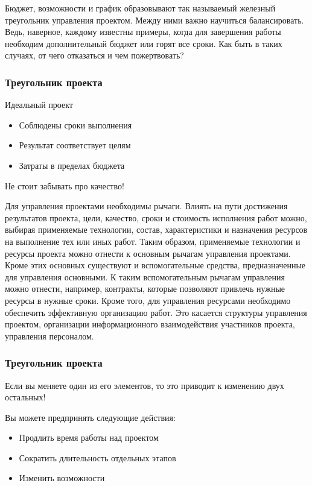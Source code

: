 \documentclass{../industrial-development}
\begin{document}
Бюджет, возможности и график образовывают так называемый железный треугольник управления проектом. Между ними важно научиться балансировать. Ведь, наверное, каждому известны примеры, когда для завершения работы необходим дополнительный бюджет или горят все сроки. Как быть в таких случаях, от чего отказаться и чем пожертвовать?
    
    \begin{frame} \frametitle{Треугольник проекта}
        \begin{block}{Идеальный проект}
            \begin{itemize}
                \item Соблюдены сроки выполнения
                \item Результат соответствует целям
                \item Затраты в пределах бюджета
            \end{itemize}
        \end{block}
        \medskip
        Не стоит забывать про \alert{качество}!
    \end{frame}
    \lecturenotes

Для управления проектами необходимы рычаги. Влиять на пути достижения результатов проекта, цели, качество, сроки и стоимость исполнения работ можно, выбирая применяемые технологии, состав, характеристики и назначения ресурсов на выполнение тех или иных работ. Таким образом, применяемые технологии и ресурсы проекта можно отнести к основным рычагам управления проектами. Кроме этих основных существуют и вспомогательные средства, предназначенные для управления основными. К таким вспомогательным рычагам управления можно отнести, например, контракты, которые позволяют привлечь нужные ресурсы в нужные сроки. Кроме того, для управления ресурсами необходимо обеспечить эффективную организацию работ. Это касается структуры управления проектом, организации информационного взаимодействия участников проекта, управления персоналом.

    \begin{frame} \frametitle{Треугольник проекта}
	Если вы меняете один из его элементов, то это приводит к изменению двух остальных!

	Вы можете предпринять следующие действия:
	\begin{itemize}
		\item Продлить время работы над проектом
		\item Сократить длительность отдельных этапов
		\item Изменить возможности
	\end{itemize}
    \end{frame}
    \lecturenotes
\end{document}
